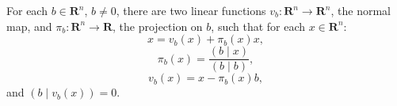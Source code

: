 For each $b \in \mathbf{R}^n$, $b \neq 0$, there are two linear functions $v_b \colon \mathbf{R}^n \rightarrow \mathbf{R}^n$, the normal map, and $\pi_b \colon \mathbf{R}^n \rightarrow \mathbf{R}$, the projection on $b$, such that for each $x \in \mathbf{R}^n$:
$$x = v_b(x) + \pi_b(x) x,$$
$$\pi_b(x) = \frac{(b \mid x)}{(b \mid b)},$$
$$v_b(x) = x - \pi_b(x) b,$$
and $(b \mid v_b(x)) = 0$.
